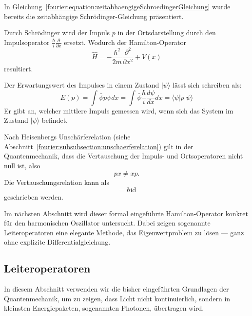 In Gleichung~\ref{fourier:equation:zeitabhaengigeSchroedingerGleichung} wurde bereits die zeitabhängige Schrödinger-Gleichung präsentiert. %


Durch Schrödinger wird der Impuls $p$ in der Ortsdarstellung durch den Impulsoperator $\frac{\hbar}{i} \frac{\partial}{\partial x}$
ersetzt.
Wodurch der Hamilton-Operator
\begin{equation}
	\hat{H} = -\frac{\hbar^2}{2m}\frac{\partial^2}{\partial x^2} + V(x)
\end{equation}	
resultiert.

Der Erwartungswert des Impulses in einem Zustand $|\psi\rangle$ lässt sich schreiben als:
\begin{equation}
	E(p) = \int \bar{\psi}p\psi dx
	= \int \bar{\psi} \frac{\hbar}{i} \frac{d\psi}{dx} dx
	= \langle \psi | p | \psi \rangle
\end{equation}
Er gibt an, welcher mittlere Impuls gemessen wird, wenn sich das System im Zustand $|\psi\rangle$ befindet.

Nach Heisenbergs Unschärferelation (siehe Abschnitt~\ref{fourier:subsubsection:unschaerferelation}) gilt in der Quantenmechanik, dass die Vertauschung der Impuls- und Ortsoperatoren nicht null ist, also
\begin{equation}
	px \neq xp.
\end{equation}
Die Vertauschungsrelation kann als
\begin{equation}
	[x, p] = \hbar \text{id}
\end{equation}
geschrieben werden.


		Im nächsten Abschnitt wird dieser formal eingeführte Hamilton-Operator konkret für den harmonischen Oszillator untersucht.
		Dabei zeigen sogenannte Leiteroperatoren eine elegante Methode, das Eigenwertproblem zu lösen — ganz ohne explizite Differentialgleichung.

	\subsection{Leiteroperatoren\label{fourier:subsection:Leiteroperatoren}} %
In diesem Abschnitt verwenden wir die bisher eingeführten Grundlagen der Quantenmechanik, um zu zeigen, dass Licht nicht kontinuierlich, sondern in kleinsten Energiepaketen, sogenannten Photonen, übertragen wird.

